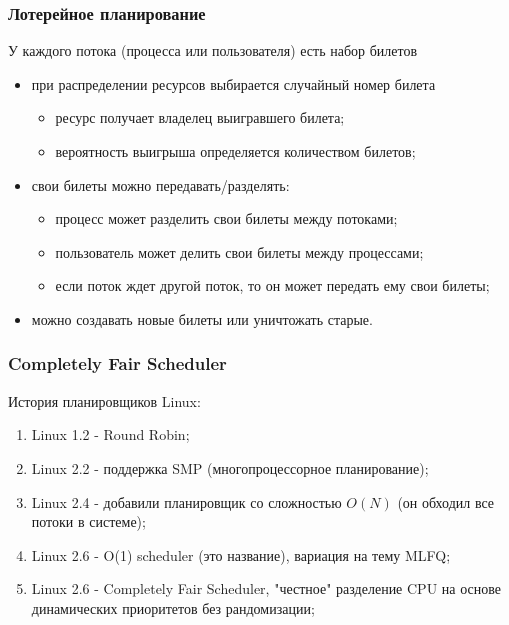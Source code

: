 \begin{frame}
\frametitle{Лотерейное планирование}

У каждого потока (процесса или пользователя) есть набор билетов
\begin{itemize}
  \item при распределении ресурсов выбирается случайный номер билета
        \begin{itemize}
          \item ресурс получает владелец выигравшего билета;
          \item вероятность выигрыша определяется количеством билетов;
        \end{itemize}
  \item свои билеты можно передавать/разделять:
        \begin{itemize}
          \item процесс может разделить свои билеты между потоками;
          \item пользователь может делить свои билеты между процессами;
          \item если поток ждет другой поток, то он может передать ему свои
                билеты;
        \end{itemize}
  \item можно создавать новые билеты или уничтожать старые.
\end{itemize}
\end{frame}

\begin{frame}
\frametitle{Completely Fair Scheduler}

История планировщиков Linux:
\begin{enumerate}
  \item Linux 1.2 - Round Robin;
  \item Linux 2.2 - поддержка SMP (многопроцессорное планирование);
  \item Linux 2.4 - добавили планировщик со сложностью $O(N)$ (он обходил все
        потоки в системе);
  \item Linux 2.6 - O(1) scheduler (это название), вариация на тему MLFQ;
  \item Linux 2.6 - Completely Fair Scheduler, "честное" разделение CPU на
        основе динамических приоритетов без рандомизации;
\end{enumerate}
\end{frame}

